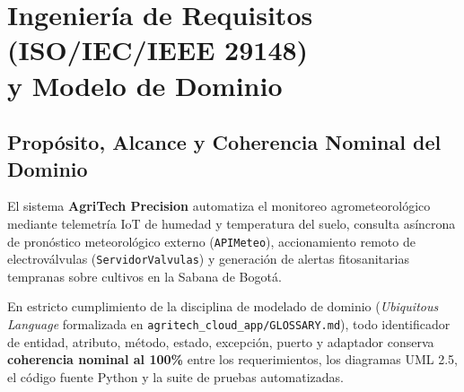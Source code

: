 \documentclass[11pt,letterpaper]{report}
\begin{document}
\chapter[Ingeniería de Requisitos (ISO/IEC/IEEE 29148) y Modelo de Dominio]{Ingeniería de Requisitos\\ (ISO/IEC/IEEE 29148)\\ y Modelo de Dominio}

\section{Propósito, Alcance y Coherencia Nominal del Dominio}
El sistema \textbf{AgriTech Precision} automatiza el monitoreo agrometeorológico mediante telemetría IoT de humedad y temperatura del suelo, consulta asíncrona de pronóstico meteorológico externo (\texttt{APIMeteo}), accionamiento remoto de electroválvulas (\texttt{ServidorValvulas}) y generación de alertas fitosanitarias tempranas sobre cultivos en la Sabana de Bogotá.

En estricto cumplimiento de la disciplina de modelado de dominio (\textit{Ubiquitous Language} formalizada en \texttt{agritech\_cloud\_app/GLOSSARY.md}), todo identificador de entidad, atributo, método, estado, excepción, puerto y adaptador conserva \textbf{coherencia nominal al 100\%} entre los requerimientos, los diagramas UML 2.5, el código fuente Python y la suite de pruebas automatizadas.
\end{document}
